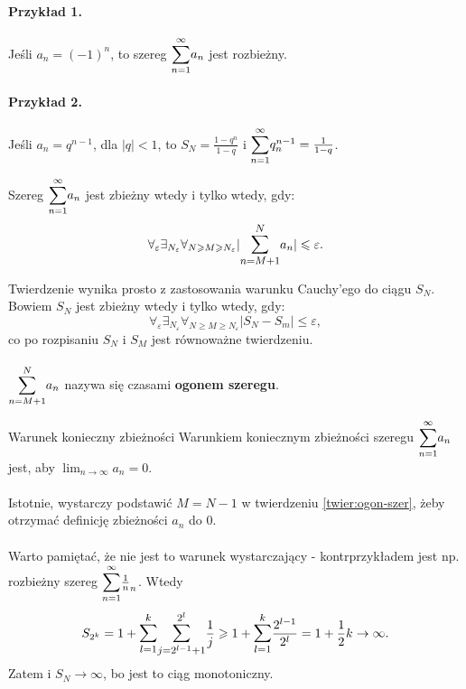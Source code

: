 \documentclass{article}
\newcounter{defi}
\numberwithin{defi}{section}
\numberwithin{defi}{section}
\newcommand{\oo}{\infty}
\providecommand{\eps}{\varepsilon}
\providecommand{\half}{\frac{1}{2}}
\newcommand{\bsum}[2]{\mathlarger{\sum_{#1}^{#2}}}
\newcommand{\szerI}[1]{\bsum{n=1}{\oo} #1_n}
\newcommand{\gras}[2]{\lim_{#1 \to \oo} #2_{#1}}
\begin{document}
\paragraph*{Przykład 1.} Jeśli $a_n = (-1)^n$, to szereg $\szerI{a}$ jest rozbieżny.
\paragraph*{Przykład 2.} Jeśli $a_n = q^{n-1}$, dla $|q| < 1$, to $S_N = \frac{1 - q^n}{1 - q}$ i $\szerI{q^{n-1}} = \frac{1}{1-q}$.


\begin{twier}{} \label{twier:ogon-szer}
    Szereg $\szerI{a}$ jest zbieżny wtedy i tylko wtedy, gdy: \begin{equation}
        \forall_\eps \exists_{N_\eps} \forall_{N \geqslant M \geqslant N_\eps} | \bsum{n= M+1}{N} a_n | \leqslant \eps.
    \end{equation} 
\end{twier}
\begin{dow}
    Twierdzenie wynika prosto z zastosowania warunku Cauchy'ego do ciągu $S_N$. Bowiem $S_N$ jest zbieżny wtedy i tylko wtedy, gdy:\begin{equation}
        \forall_\eps \exists_{N_\eps} \forall_{N \geqslant M \geqslant N_\eps} |S_N - S_m| \leqslant \eps,
    \end{equation} co po rozpisaniu $S_N$ i $S_M$ jest równoważne twierdzeniu.
\end{dow}
\paragraph*{} $\bsum{n= M+1}{N} a_n$ nazywa się czasami \textbf{ogonem szeregu}. 
\begin{obs}{Warunek konieczny zbieżności}
    Warunkiem koniecznym zbieżności szeregu $\szerI{a}$ jest, aby $\gras{n}{a} = 0$.
\end{obs}
\paragraph{} Istotnie, wystarczy podstawić $M = N-1$ w twierdzeniu \ref{twier:ogon-szer}, żeby otrzymać definicję zbieżności $a_n$ do 0.
\paragraph{} Warto pamiętać, że nie jest to warunek wystarczający - kontrprzykładem jest np. rozbieżny szereg $\szerI{\frac{1}{n}}$. Wtedy\begin{equation}
    S_{2^k} = 1 + \bsum{l = 1}{k} \bsum{j = 2^{l-1} +1}{2^{l}} \frac{1}{j} \geqslant1 +  \bsum{l = 1}{k} \frac{2^{l-1}}{2^l} = 1 + \half k \to \oo. 
\end{equation} Zatem i $S_N \to \oo$, bo jest to ciąg monotoniczny.
\end{document}
